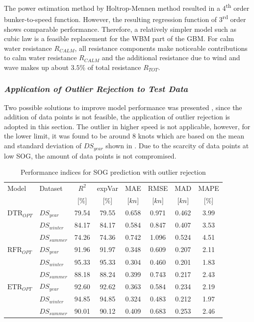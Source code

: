 The power estimation method by Holtrop-Mennen method resulted in a 4\textsuperscript{th} order bunker-to-speed function. However, the resulting regression function of 3\textsuperscript{rd} order shows comparable performance. Therefore, a relatively simpler model such as cubic law is a feasible replacement for the WBM part of the GBM. For calm water resistance $R_{CALM}$, all resistance components make noticeable contributions to calm water resistance $R_{CALM}$ and the additional resistance due to wind and wave makes up about $3.5\%$ of total resistance $R_{TOT}$.\\

\subsubsection*{\emph{Application of Outlier Rejection to Test Data}}

Two possible solutions to improve model performance was presented , since the addition of data points is not feasible, the application of outlier rejection is adopted in this section. The outlier in higher speed is not applicable, however, for the lower limit, it was found to be around 8 knots which are based on the mean and standard deviation of $DS_{year}$ shown in . Due to the scarcity of data points at low SOG, the amount of data points is not compromised.\\
\begin{table}[h!]
    \small
    \centering
    {\begin{tabular}{ l l c c c c c c }
    \hline
    Model & Dataset & $R^2$ & expVar & MAE & RMSE & MAD & MAPE \\
    & & [$\%$] & [$\%$] & [$kn$] & [$kn$] & [$kn$] & [$\%$]  \\ 
    \hline
    $\text{DTR}_{OPT}$ & $DS_{year}$ & 79.54 & 79.55 & 0.658 & 0.971 & 0.462 & 3.99 \\
    & $DS_{winter}$ & 84.17 & 84.17 & 0.584 & 0.847 & 0.407 & 3.53 \\
    & $DS_{summer}$ & 74.26 & 74.36 & 0.742  & 1.096 & 0.524 & 4.51 \\
    $\text{RFR}_{OPT}$ & $DS_{year}$  & 91.96 & 91.97 & 0.348 & 0.609 & 0.207  & 2.11 \\
    & $DS_{winter}$ & 95.33 & 95.33 & 0.304 & 0.460 & 0.201 & 1.83 \\
    & $DS_{summer}$ & 88.18 & 88.24 & 0.399 & 0.743 & 0.217 & 2.43 \\
    $\text{ETR}_{OPT}$ & $DS_{year}$ & 92.60 & 92.62 & 0.363 & 0.584 & 0.234  & 2.19 \\
    & $DS_{winter}$ & 94.85 & 94.85 &  0.324  & 0.483 & 0.212 & 1.97 \\
    & $DS_{summer}$ & 90.01 & 90.12 & 0.409 & 0.683 & 0.253  & 2.46 \\
    \hline
    \end{tabular}}
\caption{Performance indices for SOG prediction with outlier rejection}\label{tbl:sog_scores_errors_rejection}
\end{table}

